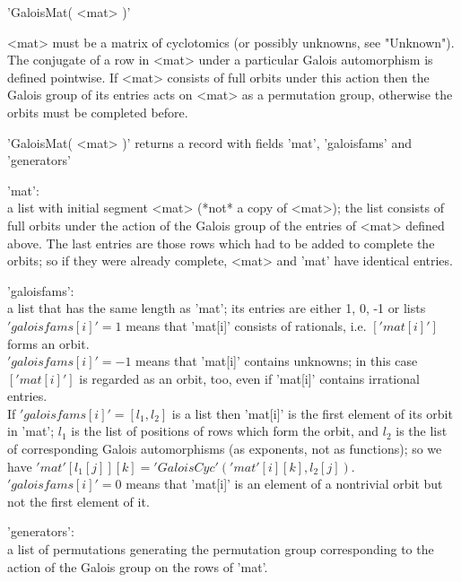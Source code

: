 
'GaloisMat( <mat> )'

<mat>  must  be  a matrix of  cyclotomics (or  possibly unknowns,  see
"Unknown").  The conjugate of a row in <mat> under a particular Galois
automorphism is  defined  pointwise.  If <mat> consists of full orbits
under this action then the Galois group of its entries acts  on  <mat>
as a permutation group, otherwise the orbits must be completed before.

'GaloisMat( <mat> )' returns a record  with fields 'mat', 'galoisfams'
and 'generators'\:

'mat':\\
      a list with initial  segment <mat> (*not* a  copy of <mat>); the
      list  consists of  full  orbits under the  action of  the Galois
      group  of the entries of  <mat> defined above. The last  entries
      are those rows  which had to be added to complete the orbits; so
      if  they were already complete, <mat> and 'mat'  have  identical
      entries.

'galoisfams':\\
      a list that has the same length as 'mat'; its entries are either
      1, 0, -1 or lists\:\\ $'galoisfams[i]'  = 1$ means that 'mat[i]'
      consists of rationals,  i.e. $[ 'mat[i]'  ]$  forms  an orbit.\\
      $'galoisfams[i]' =-1$  means that 'mat[i]' contains unknowns; in
      this case $[ 'mat[i]'  ]$ is regarded as  an orbit, too, even if
      'mat[i]' contains irrational entries.\\ If $'galoisfams[i]' =  [
      l_1, l_2 ]$ is  a list then 'mat[i]' is the first element of its
      orbit in  'mat'; $l_1$  is  the list of positions  of rows which
      form  the orbit, and $l_2$ is the  list of  corresponding Galois
      automorphisms  (as  exponents,  not  as  functions); so  we have
      $'mat'[  l_1[j] ][k]  =  'GaloisCyc'(  'mat'[i][k], l_2[j] )$.\\
      $'galoisfams[i]' =  0$  means that  'mat[i]'  is an element of a
      nontrivial orbit but not the first element of it.

'generators':\\
      a  list  of  permutations  generating  the   permutation   group
      corresponding  to the  action of the Galois group on the rows of
      'mat'.

